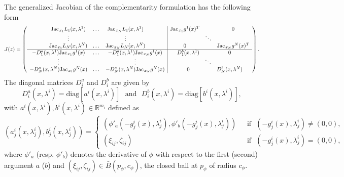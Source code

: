 \documentclass[11pt]{article}
\newcommand{\txtm}[1]{\textrm{~~#1~~}}
\newcommand{\diag}{\textrm{diag}}
\newcommand{\Jac}{\textrm{Jac\hskip+.1em}}
\newcommand{\R}{\ensuremath{\mathbb{R}}}
\begin{document}
The generalized Jacobian of the complementarity formulation has the following form
$$
J(z) =
\left(
\begin{array}{c|c}
	\begin{matrix}
	\Jac_{x_1} L_1(x, \lambda^1)  & \dots & \Jac_{x_N} L_1(x, \lambda^1)  \\
	\vdots & & \vdots \\
	\Jac_{x_1} L_N(x, \lambda^N)  & \dots & \Jac_{x_N} L_N(x, \lambda^N)  \\
	\end{matrix}
&
	\begin{matrix}
	\Jac_{x_1} g^1(x)^T & & 0 \\
	& \ddots & \\
	0 & & \Jac_{x_N} g^N(x)^T \\
	\end{matrix}	
\\
\hline 
	\begin{matrix}	
	- D_1^a(x, \lambda^1) \Jac_{x_1} g^1(x) & \dots & - D_1^a(x, \lambda^1) \Jac_{x_N} g^1(x) \\
	\vdots & & \vdots \\
	- D_N^a(x, \lambda^N) \Jac_{x_1} g^N(x) & \dots & - D_N^a(x, \lambda^N) \Jac_{x_N} g^N(x) \\
	\end{matrix}		
&
	\begin{matrix}	
	 D^b_{1}(x, \lambda^1) & & 0 \\
	 & \ddots &  \\
	0  &  &  D^b_{N}(x, \lambda^N) \\
	\end{matrix}			
\end{array}	
\right) .
$$
The diagonal matrices $D_i^a$ and $D_i^b$ are given by
$$
D_i^a(x, \lambda^i) = \diag[ a^i(x, \lambda^i) ]
\txtm{and}
D_i^b(x, \lambda^i) = \diag[ b^i(x, \lambda^i) ],
$$
with $a^i(x, \lambda^i), b^i(x, \lambda^i) \in \R^{m_i}$  defined as
$$
( a^i_j(x, \lambda_j^i) , b^i_j(x, \lambda_j^i) ) = 
\left\{
\begin{array}{cl} %
\left(  \phi'_a( -g^i_j(x), \lambda_j^i ), \phi'_b ( -g^i_j(x), \lambda_j^i ) \right) 
& \txtm{if} ( -g^i_j(x), \lambda_j^i ) \neq (0, 0), \\
  (\xi_{ij} , \zeta_{ij} )
& \txtm{if} ( -g^i_j(x), \lambda_j^i ) = (0, 0), 
\end{array}
\right.
$$
where $\phi'_a$ (resp. $\phi'_b$) denotes the derivative of $\phi$ with respect to the first (second) argument $a$ ($b$)  and $(\xi_{ij} , \zeta_{ij} ) \in \bar B(p_\phi, c_\phi)$, the closed ball at $p_\phi$ of radius $c_\phi$. 
\end{document}
